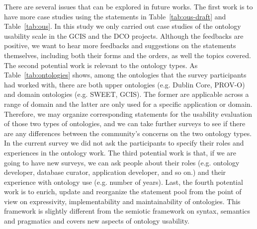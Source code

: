 There are several issues that can be explored in future works. The first work is to have more case studies using the statements in Table~\ref{tab:ous-draft} and Table~\ref{tab:ous}. In this study we only carried out case studies of the ontology usability scale in the GCIS and the DCO projects. Although the feedbacks are positive, we want to hear more feedbacks and suggestions on the statements themselves, including both their forms and the orders, as well the topics covered. The second potential work is relevant to the ontology types. As Table~\ref{tab:ontologies} shows, among the ontologies that the survey participants had worked with, there are both upper ontologies (e.g. Dublin Core, PROV-O) and domain ontologies (e.g. SWEET, GCIS). The former are applicable across a range of domain and the latter are only used for a specific application or domain. Therefore, we may organize corresponding statements for the usability evaluation of those two types of ontologies, and we can take further surveys to see if there are any differences between the community's concerns on the two ontology types. In the current survey we did not ask the participants to specify their roles and experiences in the ontology work. The third potential work is that, if we are going to have new surveys, we can ask people about their roles (e.g. ontology developer, database curator, application developer, and so on.) and their experience with ontology use (e.g. number of years). Last, the fourth potential work is to enrich, update and reorganize the statement pool from the point of view on expressivity, implementability and maintainability of ontologies. This framework is slightly different from the semiotic framework on syntax, semantics and pragmatics and covers new aspects of ontology usability.

